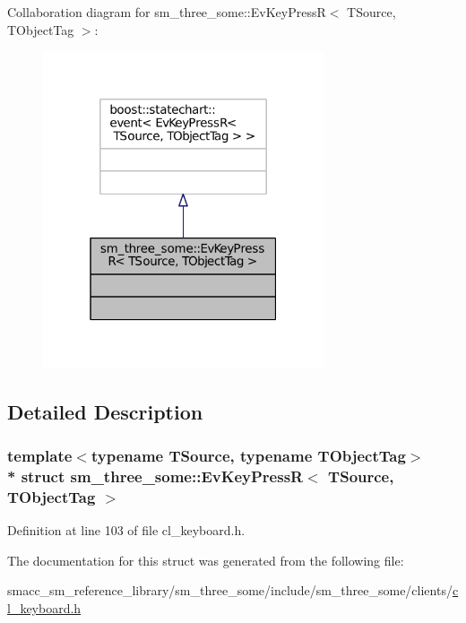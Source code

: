 Collaboration diagram for sm\+\_\+three\+\_\+some\+:\+:Ev\+Key\+PressR$<$ T\+Source, T\+Object\+Tag $>$\+:
\nopagebreak
\begin{figure}[H]
\begin{center}
\leavevmode
\includegraphics[width=235pt]{structsm__three__some_1_1EvKeyPressR__coll__graph}
\end{center}
\end{figure}


\subsection{Detailed Description}
\subsubsection*{template$<$typename T\+Source, typename T\+Object\+Tag$>$\\*
struct sm\+\_\+three\+\_\+some\+::\+Ev\+Key\+Press\+R$<$ T\+Source, T\+Object\+Tag $>$}



Definition at line 103 of file cl\+\_\+keyboard.\+h.



The documentation for this struct was generated from the following file\+:\begin{DoxyCompactItemize}
\item 
smacc\+\_\+sm\+\_\+reference\+\_\+library/sm\+\_\+three\+\_\+some/include/sm\+\_\+three\+\_\+some/clients/\hyperlink{cl__keyboard_8h}{cl\+\_\+keyboard.\+h}\end{DoxyCompactItemize}
